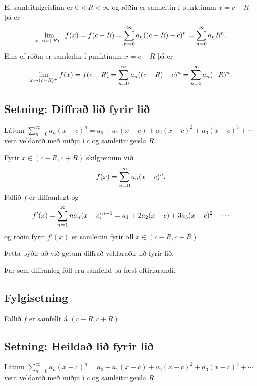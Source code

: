 \documentclass[a4paper,10pt,icelandic]{sphinxmanual}
\begin{document}
Ef samleitnigeislinn er \(0<R<\infty\) og röðin er samleitin í
punktinum \(x=c+R\) þá er
\begin{gather}
\begin{split}\lim_{x\rightarrow (c+R)^-}f(x)=f(c+R)=\sum_{n=0}^\infty
a_n((c+R)-c)^n=\sum_{n=0}^\infty a_nR^n.\end{split}\notag
\end{gather}
Eins ef röðin er samleitin í punktinum \(x=c-R\) þá er
\begin{gather}
\begin{split}\lim_{x\rightarrow (c-R)^+}f(x)=f(c-R)=\sum_{n=0}^\infty
a_n((c-R)-c)^n=\sum_{n=0}^\infty a_n(-R)^n.\end{split}\notag
\end{gather}

\subsection{Setning: Diffrað lið fyrir lið}
\label{kafli10:setning-diffra-li-fyrir-li}
Látum \(\sum_{n=0}^\infty a_n(x-c)^n=a_0+a_1(x-c)+a_2(x-c)^2+a_3(x-c)^3+\cdots\)
vera veldaröð með miðju í \(c\) og samleitnigeisla \(R\).

Fyrir \(x\in(c-R, c+R)\) skilgreinum við
\begin{gather}
\begin{split}f(x)=\sum_{n=0}^\infty a_n(x-c)^n.\end{split}\notag
\end{gather}
Fallið \(f\) er diffranlegt og
\begin{gather}
\begin{split}f'(x)=\sum_{n=1}^\infty na_n(x-c)^{n-1}=a_1+2a_2(x-c)+3a_3(x-c)^2+\cdots\end{split}\notag
\end{gather}
og röðin fyrir \(f'(x)\) er samleitin fyrir öll
\(x\in(c-R, c+R)\).

Þetta þýðir að við getum diffrað veldaraðir lið fyrir lið.

Þar sem diffranleg föll eru samfelld þá fæst eftirfarandi.


\subsection{Fylgisetning}
\label{kafli10:fylgisetning}
Fallið \(f\) er samfellt á \((c-R, c+R)\).


\subsection{Setning: Heildað lið fyrir lið}
\label{kafli10:setning-heilda-li-fyrir-li}
Látum
\(\sum_{n=0}^\infty a_n(x-c)^n=a_0+a_1(x-c)+a_2(x-c)^2+a_3(x-c)^3+\cdots\)
vera veldaröð með miðju í \(c\) og samleitnigeisla \(R\).
\end{document}
